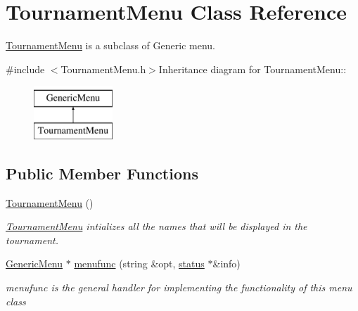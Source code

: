 \hypertarget{classTournamentMenu}{
\section{TournamentMenu Class Reference}
\label{classTournamentMenu}
}


\hyperlink{classTournamentMenu}{TournamentMenu} is a subclass of Generic menu.  


{\ttfamily \#include $<$TournamentMenu.h$>$}Inheritance diagram for TournamentMenu::\begin{figure}[H]
\begin{center}
\leavevmode
\includegraphics[height=2cm]{classTournamentMenu}
\end{center}
\end{figure}
\subsection*{Public Member Functions}
\begin{DoxyCompactItemize}
\item 
\hypertarget{classTournamentMenu_a8f635315a8f2e7ba30b1b87c867f76df}{
\hyperlink{classTournamentMenu_a8f635315a8f2e7ba30b1b87c867f76df}{TournamentMenu} ()}
\label{classTournamentMenu_a8f635315a8f2e7ba30b1b87c867f76df}

\begin{DoxyCompactList}\small\item\em \hyperlink{classTournamentMenu}{TournamentMenu} intializes all the names that will be displayed in the tournament. \item\end{DoxyCompactList}\item 
\hyperlink{classGenericMenu}{GenericMenu} $\ast$ \hyperlink{classTournamentMenu_a86ce030ba6728404ddc49aaacb45dd34}{menufunc} (string \&opt, \hyperlink{classstatus}{status} $\ast$\&info)
\begin{DoxyCompactList}\small\item\em menufunc is the general handler for implementing the functionality of this menu class \item\end{DoxyCompactList}\end{DoxyCompactItemize}


